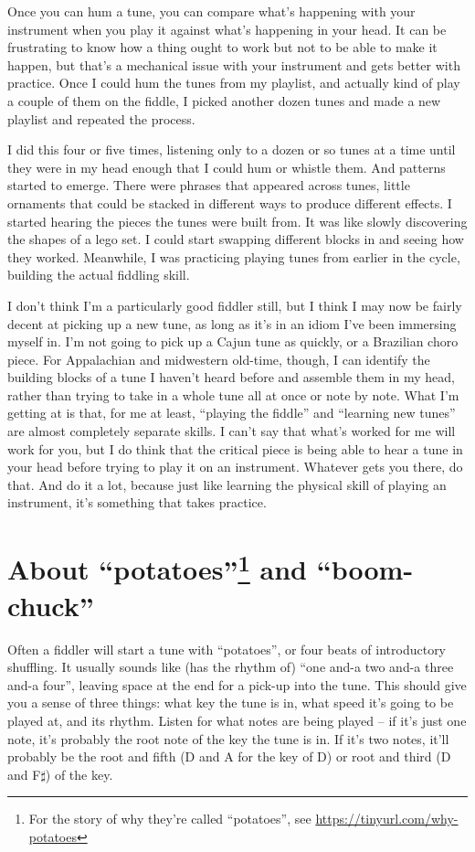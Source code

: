 Once you can hum a tune, you can compare what's happening with your
instrument when you play it against what's happening in your head. It
can be frustrating to know how a thing ought to work but not to be
able to make it happen, but that's a mechanical issue with your
instrument and gets better with practice. Once I could hum the tunes
from my playlist, and actually kind of play a couple of them on the
fiddle, I picked another dozen tunes and made a new playlist and
repeated the process.

I did this four or five times, listening only to a dozen or so tunes
at a time until they were in my head enough that I could hum or
whistle them. And patterns started to emerge. There were phrases that
appeared across tunes, little ornaments that could be stacked in
different ways to produce different effects. I started hearing the
pieces the tunes were built from. It was like slowly discovering the
shapes of a lego set. I could start swapping different blocks in and
seeing how they worked. Meanwhile, I was practicing playing tunes from
earlier in the cycle, building the actual fiddling skill.

I don't think I'm a particularly good fiddler still, but I think I may
now be fairly decent at picking up a new tune, as long as it's in an
idiom I've been immersing myself in. I'm not going to pick up a Cajun
tune as quickly, or a Brazilian choro piece. For Appalachian and
midwestern old-time, though, I can identify the building blocks of a
tune I haven't heard before and assemble them in my head, rather than
trying to take in a whole tune all at once or note by note. What I'm
getting at is that, for me at least, ``playing the fiddle'' and
``learning new tunes'' are almost completely separate skills. I can't
say that what's worked for me will work for you, but I do think that
the critical piece is being able to hear a tune in your head before
trying to play it on an instrument. Whatever gets you there, do
that. And do it a lot, because just like learning the physical skill
of playing an instrument, it's something that takes practice.

\section*{About ``potatoes''\footnote{For the story of why they're called ``potatoes'', see \url{https://tinyurl.com/why-potatoes}} and ``boom-chuck''}

Often a fiddler will start a tune with ``potatoes'', or four beats of
introductory shuffling. It usually sounds like (has the rhythm of)
``one and-a two and-a three and-a four'', leaving space at the end for
a pick-up into the tune. This should give you a sense of three
things: what key the tune is in, what speed it's going to be played
at, and its rhythm. Listen for what notes are being played -- if it's
just one note, it's probably the root note of the key the tune is
in. If it's two notes, it'll probably be the root and fifth (D and A
for the key of D) or root and third (D and F$\sharp$) of the key.

